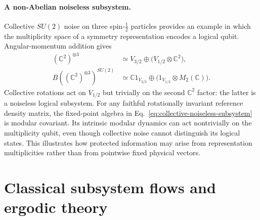 \documentclass[a4paper,11pt]{article}
\theoremstyle{definition}
\begin{document}
\paragraph{A non-Abelian noiseless subsystem.}
Collective $SU(2)$ noise on three spin-$\frac12$ particles provides an
example in which the multiplicity space of a symmetry representation
encodes a logical qubit. Angular-momentum addition gives
\begin{align}
 (\mathbb C^2)^{\otimes3}
 &\simeq V_{3/2}\oplus\bigl(V_{1/2}\otimes\mathbb C^2\bigr),\nonumber\\
 B((\mathbb C^2)^{\otimes3})^{SU(2)}
 &\simeq\mathbb C1_{V_{3/2}}\oplus
       \bigl(1_{V_{1/2}}\otimes M_2(\mathbb C)\bigr).
 \label{eq:collective-noiseless-subsystem}
\end{align}
Collective rotations act on $V_{1/2}$ but trivially on the second
$\mathbb C^2$ factor: the latter is a noiseless logical subsystem.
For any faithful rotationally invariant reference density matrix, the
fixed-point algebra in Eq.~\eqref{eq:collective-noiseless-subsystem}
is modular covariant. Its intrinsic modular dynamics can act
nontrivially on the multiplicity qubit, even though collective noise
cannot distinguish its logical states. This illustrates how protected
information may arise from representation multiplicities rather than
from pointwise fixed physical vectors.

\section{Classical subsystem flows and ergodic theory}\label{sec:classical}
\end{document}
